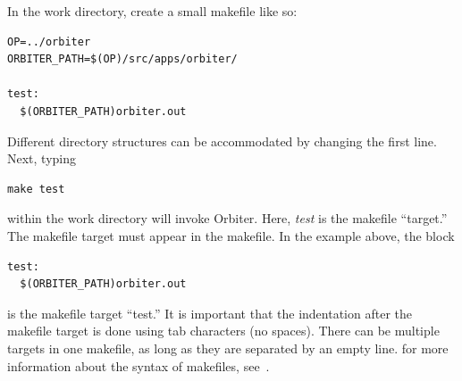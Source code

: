 In the work directory, create a small makefile like so:
\begin{verbatim}
OP=../orbiter
ORBITER_PATH=$(OP)/src/apps/orbiter/

test:
  $(ORBITER_PATH)orbiter.out
\end{verbatim}
Different directory structures can be accommodated by changing the first line.
Next, typing 
\begin{verbatim}
make test
\end{verbatim} 
within the work directory will invoke Orbiter. 
Here, {\em test} is the makefile ``target.'' The makefile target must appear in the makefile.
In the example above, the block 
\begin{verbatim}
test:
  $(ORBITER_PATH)orbiter.out
\end{verbatim}
is the makefile target ``test.''
It is important that the indentation after the makefile target is done using tab characters (no spaces).
There can be multiple targets in one makefile, as long as they are separated by an empty line.
for more information about the syntax of makefiles, see~\cite{make}.

\smallskip

